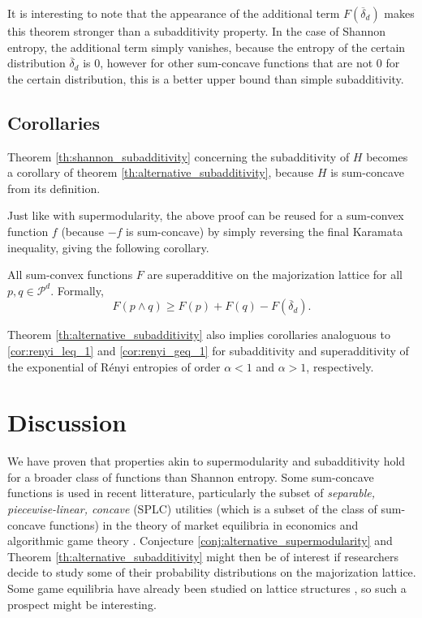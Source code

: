 It is interesting to note that the appearance of the additional term $F(\overline{\delta}_d)$ makes this theorem stronger than a subadditivity property. In the case of Shannon entropy, the additional term simply vanishes, because the entropy of the certain distribution $\overline{\delta}_d$ is 0, however for other sum-concave functions that are not 0 for the certain distribution, this is a better upper bound than simple subadditivity.



\subsection{Corollaries}

Theorem \ref{th:shannon_subadditivity} concerning the subadditivity of $H$ becomes a corollary of theorem \ref{th:alternative_subadditivity}, because $H$ is sum-concave from its definition.

Just like with supermodularity, the above proof can be reused for a sum-convex function $f$ (because $-f$ is sum-concave) by simply reversing the final Karamata inequality, giving the following corollary.

\begin{corollary} \label{cor:superadditivity_sum-convex}
    All sum-convex functions $F$ are superadditive on the majorization lattice for all $p, q \in \mathcal{P}^d$. Formally,
    \begin{equation} \label{eq:superadditivity}
        F(p \wedge q) \geq F(p) + F(q) - F(\overline{\delta}_d).
    \end{equation}
\end{corollary}

Theorem \ref{th:alternative_subadditivity} also implies corollaries analoguous to \ref{cor:renyi_leq_1} and \ref{cor:renyi_geq_1} for subadditivity and superadditivity of the exponential of Rényi entropies of order $\alpha < 1$ and $\alpha > 1$, respectively.



\section{Discussion}

We have proven that properties akin to supermodularity and subadditivity hold for a broader class of functions than Shannon entropy. Some sum-concave functions is used in recent litterature, particularly the subset of \textit{separable, piecewise-linear, concave} (SPLC) utilities (which is a subset of the class of sum-concave functions) in the theory of market equilibria in economics and algorithmic game theory \cite{vazirani_market_2011, anari_nash_2017}. Conjecture \ref{conj:alternative_supermodularity} and Theorem \ref{th:alternative_subadditivity} might then be of interest if researchers decide to study some of their probability distributions on the majorization lattice. Some game equilibria have already been studied on lattice structures \cite{agliardi_generalization_2000}, so such a prospect might be interesting.

